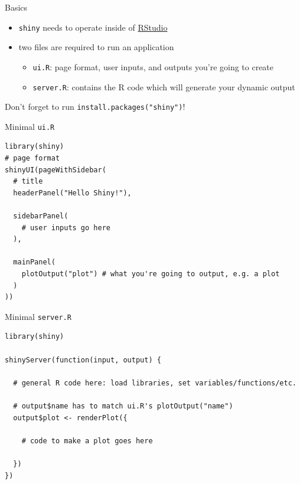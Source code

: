 \documentclass[sans,aspectratio=169,presentation,bigger,fleqn]{beamer}
\begin{document}
\begin{frame}[fragile,label=sec-2]{Basics}
 \begin{itemize}
\item \texttt{shiny} needs to operate inside of \href{http://www.rstudio.com/}{RStudio}
\item\relax [At least] two files are required to run an application
\begin{itemize}
\item \texttt{ui.R}: page format, user inputs, and outputs you're going to create
\item \texttt{server.R}: contains the R code which will generate your dynamic output
\end{itemize}
\end{itemize}

\vspace{0.5cm}

Don't forget to run \texttt{install.packages("shiny")}!
\end{frame}
\begin{frame}[fragile,label=sec-3]{Minimal \texttt{ui.R}}
 \scriptsize
\begin{verbatim}
library(shiny)
# page format
shinyUI(pageWithSidebar(
  # title
  headerPanel("Hello Shiny!"),

  sidebarPanel(
    # user inputs go here
  ),

  mainPanel(
    plotOutput("plot") # what you're going to output, e.g. a plot
  )
))
\end{verbatim}
\scriptsize
\end{frame}
\begin{frame}[fragile,label=sec-4]{Minimal \texttt{server.R}}
 \scriptsize
\begin{verbatim}
library(shiny)

shinyServer(function(input, output) {

  # general R code here: load libraries, set variables/functions/etc.

  # output$name has to match ui.R's plotOutput("name")
  output$plot <- renderPlot({

    # code to make a plot goes here

  })
})
\end{verbatim}
\scriptsize
\end{frame}
\end{document}
